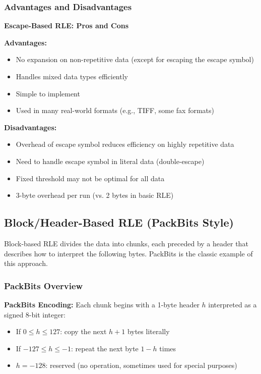 \subsubsection{Advantages and Disadvantages}

\begin{importantbox}
\textbf{Escape-Based RLE: Pros and Cons}

\textbf{Advantages:}
\begin{itemize}
    \item No expansion on non-repetitive data (except for escaping the escape symbol)
    \item Handles mixed data types efficiently
    \item Simple to implement
    \item Used in many real-world formats (e.g., TIFF, some fax formats)
\end{itemize}

\textbf{Disadvantages:}
\begin{itemize}
    \item Overhead of escape symbol reduces efficiency on highly repetitive data
    \item Need to handle escape symbol in literal data (double-escape)
    \item Fixed threshold may not be optimal for all data
    \item 3-byte overhead per run (vs. 2 bytes in basic RLE)
\end{itemize}
\end{importantbox}

\newpage
\subsection{Block/Header-Based RLE (PackBits Style)}

Block-based RLE divides the data into chunks, each preceded by a header that describes how to interpret the following bytes. PackBits is the classic example of this approach.

\subsubsection{PackBits Overview}

\begin{definitionbox}
\textbf{PackBits Encoding:} Each chunk begins with a 1-byte header $h$ interpreted as a signed 8-bit integer:
\begin{itemize}
    \item If $0 \leq h \leq 127$: copy the next $h+1$ bytes literally
    \item If $-127 \leq h \leq -1$: repeat the next byte $1-h$ times
    \item $h = -128$: reserved (no operation, sometimes used for special purposes)
\end{itemize}
\end{definitionbox}

